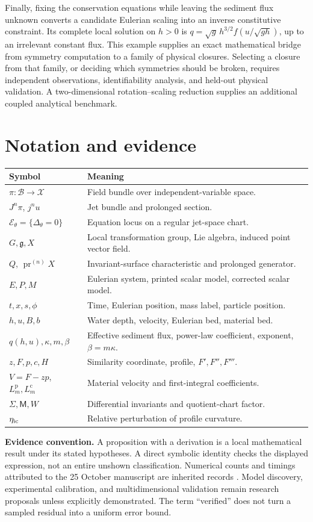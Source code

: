 \documentclass[11pt,a4paper,oneside]{report}
\numberwithin{equation}{chapter}
\newcommand{\E}{\mathcal E}
\newcommand{\pr}{\operatorname{pr}}
\begin{document}
Finally, fixing the conservation equations while leaving the sediment flux unknown converts a candidate Eulerian scaling into an inverse constitutive constraint. Its complete local solution on $h>0$ is $q=\sqrt g\,h^{3/2}f(u/\sqrt{gh})$, up to an irrelevant constant flux. This example supplies an exact mathematical bridge from symmetry computation to a family of physical closures. Selecting a closure from that family, or deciding which symmetries should be broken, requires independent observations, identifiability analysis, and held-out physical validation. A two-dimensional rotation--scaling reduction supplies an additional coupled analytical benchmark.

\chapter*{Notation and evidence}
\begin{longtable}{@{}p{}p{}@{}}
\toprule Symbol & Meaning\\\midrule
$\pi:\mathcal B\to\mathcal X$ & Field bundle over independent-variable space.\\
$J^n\pi$, $j^nu$ & Jet bundle and prolonged section.\\
$\E_\theta=\{\Delta_\theta=0\}$ & Equation locus on a regular jet-space chart.\\
$G,\mathfrak g,X$ & Local transformation group, Lie algebra, induced point vector field.\\
$Q$, $\pr^{(n)}X$ & Invariant-surface characteristic and prolonged generator.\\
$E,P,M$ & Eulerian system, printed scalar model, corrected scalar model.\\
$t,x,s,\phi$ & Time, Eulerian position, mass label, particle position.\\
$h,u,B,b$ & Water depth, velocity, Eulerian bed, material bed.\\
$q(h,u),\kappa,m,\beta$ & Effective sediment flux, power-law coefficient, exponent, $\beta=m\kappa$.\\
$z,F,p,c,H$ & Similarity coordinate, profile, $F',F'',F'''$.\\
$V=F-zp$, $L_m^{\mathrm p},L_m^{\mathrm c}$ & Material velocity and first-integral coefficients.\\
$\Sigma,\mathsf M,W$ & Differential invariants and quotient-chart factor.\\
$\eta_{\rm ic}$ & Relative perturbation of profile curvature.\\\bottomrule
\end{longtable}
\textbf{Evidence convention.} A proposition with a derivation is a local mathematical result under its stated hypotheses. A direct symbolic identity checks the displayed expression, not an entire unshown classification. Numerical counts and timings attributed to the 25 October manuscript are inherited records \cite{projectdraft}. Model discovery, experimental calibration, and multidimensional validation remain research proposals unless explicitly demonstrated. The term ``verified'' does not turn a sampled residual into a uniform error bound.
\tableofcontents
\clearpage{}
\end{document}
